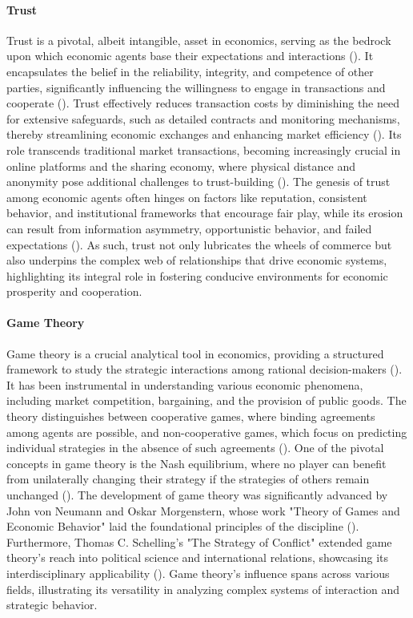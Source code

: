 \documentclass{article}
\begin{document}
\paragraph{Trust}
Trust is a pivotal, albeit intangible, asset in economics, serving as the bedrock upon which economic agents base their expectations and interactions (\cite{economicSociology}). It encapsulates the belief in the reliability, integrity, and competence of other parties, significantly influencing the willingness to engage in transactions and cooperate (\cite{fukuyama}). Trust effectively reduces transaction costs by diminishing the need for extensive safeguards, such as detailed contracts and monitoring mechanisms, thereby streamlining economic exchanges and enhancing market efficiency (\cite{contractTheory}). Its role transcends traditional market transactions, becoming increasingly crucial in online platforms and the sharing economy, where physical distance and anonymity pose additional challenges to trust-building (\cite{sharingEconomy}). The genesis of trust among economic agents often hinges on factors like reputation, consistent behavior, and institutional frameworks that encourage fair play, while its erosion can result from information asymmetry, opportunistic behavior, and failed expectations (\cite{institutionalEconomics}). As such, trust not only lubricates the wheels of commerce but also underpins the complex web of relationships that drive economic systems, highlighting its integral role in fostering conducive environments for economic prosperity and cooperation.

\paragraph{Game Theory}
Game theory is a crucial analytical tool in economics, providing a structured framework to study the strategic interactions among rational decision-makers (\cite{osborne}). It has been instrumental in understanding various economic phenomena, including market competition, bargaining, and the provision of public goods. The theory distinguishes between cooperative games, where binding agreements among agents are possible, and non-cooperative games, which focus on predicting individual strategies in the absence of such agreements (\cite{nash}). One of the pivotal concepts in game theory is the Nash equilibrium, where no player can benefit from unilaterally changing their strategy if the strategies of others remain unchanged (\cite{nash1950}). The development of game theory was significantly advanced by John von Neumann and Oskar Morgenstern, whose work "Theory of Games and Economic Behavior" laid the foundational principles of the discipline (\cite{vonneumann}). Furthermore, Thomas C. Schelling's "The Strategy of Conflict" extended game theory's reach into political science and international relations, showcasing its interdisciplinary applicability (\cite{schelling}). Game theory's influence spans across various fields, illustrating its versatility in analyzing complex systems of interaction and strategic behavior.
\end{document}
